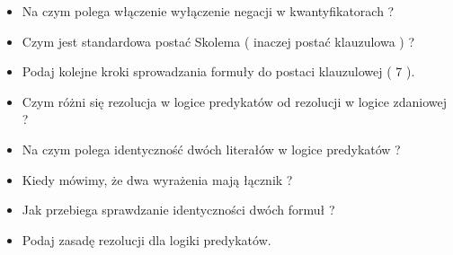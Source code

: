 \documentclass[a4paper,15pt]{article}
\begin{document}
\begin{itemize}
\item Na czym polega włączenie wyłączenie negacji w kwantyfikatorach ?

\item Czym jest standardowa postać Skolema ( inaczej postać klauzulowa ) ?

\item Podaj kolejne kroki sprowadzania formuły do postaci klauzulowej ( 7 ).

\item Czym różni się rezolucja w logice predykatów od rezolucji w logice zdaniowej ?

\item Na czym polega identyczność dwóch literałów w logice predykatów ?

\item Kiedy mówimy, że dwa wyrażenia mają łącznik ?

\item Jak przebiega sprawdzanie identyczności dwóch formuł ?

\item Podaj zasadę rezolucji dla logiki predykatów.


\end{itemize}
\end{document}
